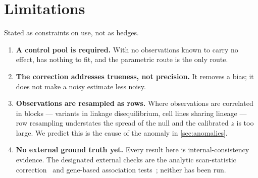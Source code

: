 \section{Limitations}
\label{sec:limitations}

Stated as constraints on use, not as hedges.

\begin{enumerate}
  \item \textbf{A control pool is required.} With no observations known to carry no effect,
         has nothing to fit, and the parametric route is the only route.
  \item \textbf{The correction addresses trueness, not precision.} It removes a bias; it does
        not make a noisy estimate less noisy.
  \item \textbf{Observations are resampled as rows.} Where observations are correlated in
        blocks --- variants in linkage disequilibrium, cell lines sharing lineage --- row
        resampling understates the spread of the null and the calibrated $z$ is too large. We
        predict this is the cause of the anomaly in \cref{sec:anomalies}.\Pending{}
  \item \textbf{No external ground truth yet.} Every result here is internal-consistency
        evidence. The designated external checks are the analytic scan-statistic
        correction~\cite{darling1956limit} and gene-based association
        tests~\cite{deleeuw2015magma}; neither has been run.\Pending{}
\end{enumerate}
